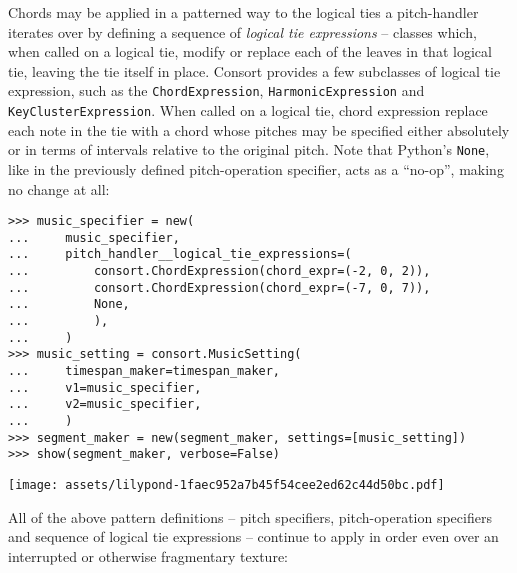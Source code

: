 \noindent Chords may be applied in a patterned way to the logical ties a
pitch-handler iterates over by defining a sequence of \emph{logical tie
expressions} -- classes which, when called on a logical tie, modify or replace
each of the leaves in that logical tie, leaving the tie itself in place.
Consort provides a few subclasses of logical tie expression, such as the
\texttt{ChordExpression}, \texttt{HarmonicExpression} and
\texttt{KeyClusterExpression}. When called on a logical tie, chord expression
replace each note in the tie with a chord whose pitches may be specified either
absolutely or in terms of intervals relative to the original pitch. Note that
Python's \texttt{None}, like in the previously defined pitch-operation
specifier, acts as a \enquote{no-op}, making no change at all:

\begin{comment}
<abjad>[stylesheet=../consort.ily]
music_specifier = new(
    music_specifier,
    pitch_handler__logical_tie_expressions=(
        consort.ChordExpression(chord_expr=(-2, 0, 2)),
        consort.ChordExpression(chord_expr=(-7, 0, 7)),
        None,
        ),
    )
music_setting = consort.MusicSetting(
    timespan_maker=timespan_maker,
    v1=music_specifier,
    v2=music_specifier,
    )
segment_maker = new(segment_maker, settings=[music_setting])
show(segment_maker, verbose=False)
</abjad>
\end{comment}

\begin{abjadbookoutput}
\begin{singlespacing}
\vspace{-0.5\baselineskip}
\begin{lstlisting}
>>> music_specifier = new(
...     music_specifier,
...     pitch_handler__logical_tie_expressions=(
...         consort.ChordExpression(chord_expr=(-2, 0, 2)),
...         consort.ChordExpression(chord_expr=(-7, 0, 7)),
...         None,
...         ),
...     )
>>> music_setting = consort.MusicSetting(
...     timespan_maker=timespan_maker,
...     v1=music_specifier,
...     v2=music_specifier,
...     )
>>> segment_maker = new(segment_maker, settings=[music_setting])
>>> show(segment_maker, verbose=False)
\end{lstlisting}
\noindent\texttt{[image: assets/lilypond-1faec952a7b45f54cee2ed62c44d50bc.pdf]}
\end{singlespacing}
\end{abjadbookoutput}

\noindent All of the above pattern definitions -- pitch specifiers,
pitch-operation specifiers and sequence of logical tie expressions -- continue
to apply in order even over an interrupted or otherwise fragmentary texture:

